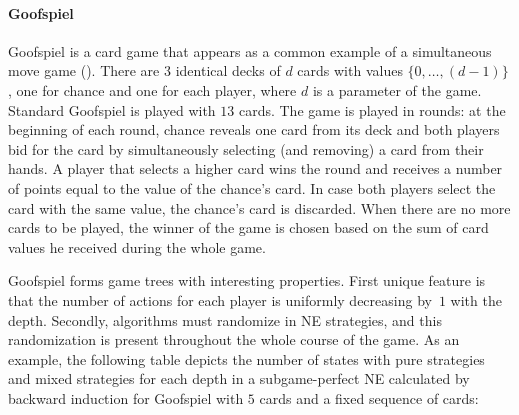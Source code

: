 \paragraph{\textbf{Goofspiel}}
Goofspiel is a card game that appears as a common example of a simultaneous move game (\eg \cite{Ross71Goofspiel,Rhoads12Computer,Saffidine12SMAB,Lanctot13Goofspiel}).
There are $3$ identical decks of $d$ cards with values $\{0,\dots, (d-1)\}$, one for chance and one for each player, 
where $d$ is a parameter of the game. %
Standard Goofspiel is played with $13$ cards.
The game is played in rounds: at the beginning of each round, chance reveals one card from its deck and both players bid for the card by simultaneously selecting (and removing) a card from their hands.
A player that selects a higher card wins the round and receives a number of points equal to the value of the chance's card.
In case both players select the card with the same value, the chance's card is discarded.
When there are no more cards to be played, the winner of the game is chosen based on the sum of card values he received during the whole game.


Goofspiel forms game trees with interesting properties.
First unique feature is that the number of actions for each player is uniformly decreasing by~$1$ with the depth.
Secondly, algorithms must randomize in NE strategies, and this randomization is present throughout the whole course of the game.
As an example, the following table depicts the number of states with pure strategies and mixed strategies for each depth in a subgame-perfect NE calculated by backward induction for Goofspiel with $5$ cards and a fixed sequence of cards:

